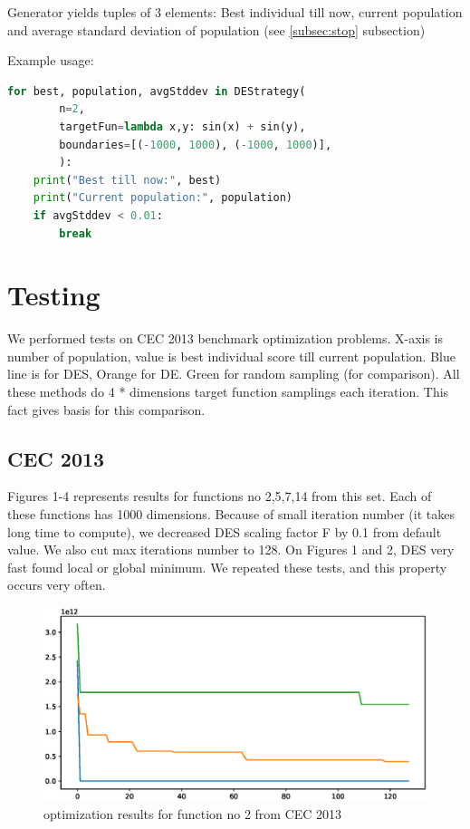 \documentclass[11pt,a4paper]{article}
\begin{document}
Generator yields tuples of 3 elements:
Best individual till now, current population and average standard deviation of population (see \ref{subsec:stop} subsection)

Example usage:
\begin{lstlisting}[language=Python]
for best, population, avgStddev in DEStrategy(
        n=2,
        targetFun=lambda x,y: sin(x) + sin(y),
        boundaries=[(-1000, 1000), (-1000, 1000)],
        ):
    print("Best till now:", best)
    print("Current population:", population)
    if avgStddev < 0.01:
        break
\end{lstlisting}


\section{Testing}\label{sec:testing}

We performed tests on CEC 2013 benchmark optimization problems.
X-axis is number of population, value is best individual score till current population.
Blue line is for DES, Orange for DE. Green for random sampling (for comparison).
All these methods do 4 * dimensions target function samplings each iteration.
This fact gives basis for this comparison.

\subsection{CEC 2013}\label{subsec:cec_testing}

Figures 1-4 represents results for functions no 2,5,7,14 from this set.
Each of these functions has 1000 dimensions.
Because of small iteration number (it takes long time to compute), we decreased DES scaling factor F by 0.1 from default value.
We also cut max iterations number to 128.
On Figures 1 and 2, DES very fast found local or global minimum. We repeated these tests, and this property occurs very often.

\begin{figure}[H]
	\centering
	\includegraphics[scale=0.6]{cec2013_1.eps}
	\caption{optimization results for function no 2 from CEC 2013}
\end{figure}
\end{document}
